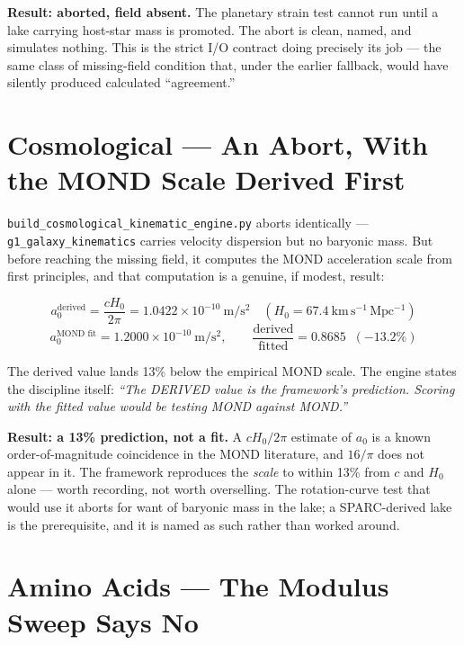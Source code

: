 \documentclass[11pt, letterpaper, openany]{book}
\begin{document}
\begin{nullbox}
\textbf{Result: aborted, field absent.} The planetary strain test cannot run until a lake carrying
host-star mass is promoted. The abort is clean, named, and simulates nothing. This is the strict
I/O contract doing precisely its job --- the same class of missing-field condition that, under the
earlier fallback, would have silently produced calculated ``agreement.''
\end{nullbox}

\section{Cosmological --- An Abort, With the MOND Scale Derived First}

\texttt{build\_cosmological\_kinematic\_engine.py} aborts identically --- \texttt{g1\_galaxy\_kinematics}
carries velocity dispersion but no baryonic mass. But before reaching the missing field, it computes
the MOND acceleration scale from first principles, and that computation is a genuine, if modest,
result:

\begin{signalbox}
\[
a_0^{\text{derived}} = \frac{cH_0}{2\pi} = 1.0422\times10^{-10}~\mathrm{m/s^2}
\quad(H_0 = 67.4~\mathrm{km\,s^{-1}\,Mpc^{-1}})
\]
\[
a_0^{\text{MOND fit}} = 1.2000\times10^{-10}~\mathrm{m/s^2},
\qquad \frac{\text{derived}}{\text{fitted}} = 0.8685 \;\; (-13.2\%)
\]
\end{signalbox}

The derived value lands 13\% below the empirical MOND scale. The engine states the discipline
itself: \emph{``The DERIVED value is the framework's prediction. Scoring with the fitted value would
be testing MOND against MOND.''}

\begin{warningbox}
\textbf{Result: a 13\% prediction, not a fit.} A $cH_0/2\pi$ estimate of $a_0$ is a known
order-of-magnitude coincidence in the MOND literature, and $16/\pi$ does not appear in it. The
framework reproduces the \emph{scale} to within 13\% from $c$ and $H_0$ alone --- worth recording,
not worth overselling. The rotation-curve test that would use it aborts for want of baryonic mass in
the lake; a SPARC-derived lake is the prerequisite, and it is named as such rather than worked
around.
\end{warningbox}

\section{Amino Acids --- The Modulus Sweep Says No}
\end{document}
